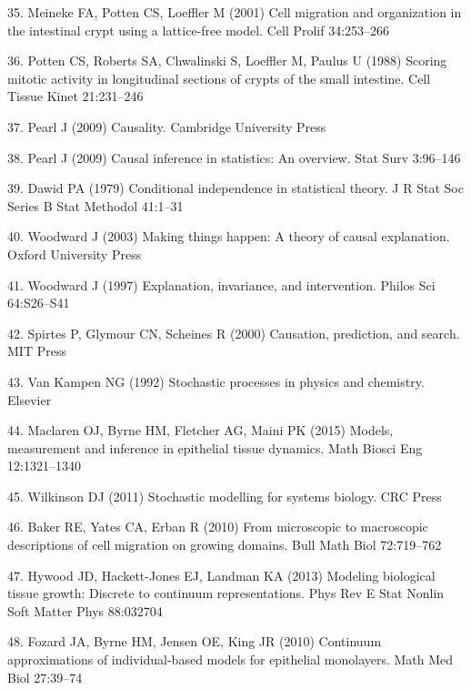 \documentclass[10pt,letterpaper]{article}
\begin{document}
\hypertarget{ref-Meineke2001-na}{}
35. Meineke FA, Potten CS, Loeffler M (2001) Cell migration and
organization in the intestinal crypt using a lattice-free model. Cell
Prolif 34:253--266

\hypertarget{ref-Potten1988-tq}{}
36. Potten CS, Roberts SA, Chwalinski S, Loeffler M, Paulus U (1988)
Scoring mitotic activity in longitudinal sections of crypts of the small
intestine. Cell Tissue Kinet 21:231--246

\hypertarget{ref-Pearl2009-qh}{}
37. Pearl J (2009) Causality. Cambridge University Press

\hypertarget{ref-Pearl2009-jp}{}
38. Pearl J (2009) Causal inference in statistics: An overview. Stat
Surv 3:96--146

\hypertarget{ref-Dawid1979-gu}{}
39. Dawid PA (1979) Conditional independence in statistical theory. J R
Stat Soc Series B Stat Methodol 41:1--31

\hypertarget{ref-Woodward2003-oz}{}
40. Woodward J (2003) Making things happen: A theory of causal
explanation. Oxford University Press

\hypertarget{ref-Woodward1997-dk}{}
41. Woodward J (1997) Explanation, invariance, and intervention. Philos
Sci 64:S26--S41

\hypertarget{ref-Spirtes2000-zd}{}
42. Spirtes P, Glymour CN, Scheines R (2000) Causation, prediction, and
search. MIT Press

\hypertarget{ref-Van_Kampen1992-ik}{}
43. Van Kampen NG (1992) Stochastic processes in physics and chemistry.
Elsevier

\hypertarget{ref-Maclaren2015-be}{}
44. Maclaren OJ, Byrne HM, Fletcher AG, Maini PK (2015) Models,
measurement and inference in epithelial tissue dynamics. Math Biosci Eng
12:1321--1340

\hypertarget{ref-Wilkinson2011-wh}{}
45. Wilkinson DJ (2011) Stochastic modelling for systems biology. CRC
Press

\hypertarget{ref-Baker2010-ne}{}
46. Baker RE, Yates CA, Erban R (2010) From microscopic to macroscopic
descriptions of cell migration on growing domains. Bull Math Biol
72:719--762

\hypertarget{ref-Hywood2013-zf}{}
47. Hywood JD, Hackett-Jones EJ, Landman KA (2013) Modeling biological
tissue growth: Discrete to continuum representations. Phys Rev E Stat
Nonlin Soft Matter Phys 88:032704

\hypertarget{ref-Fozard2010-hd}{}
48. Fozard JA, Byrne HM, Jensen OE, King JR (2010) Continuum
approximations of individual-based models for epithelial monolayers.
Math Med Biol 27:39--74
\end{document}
